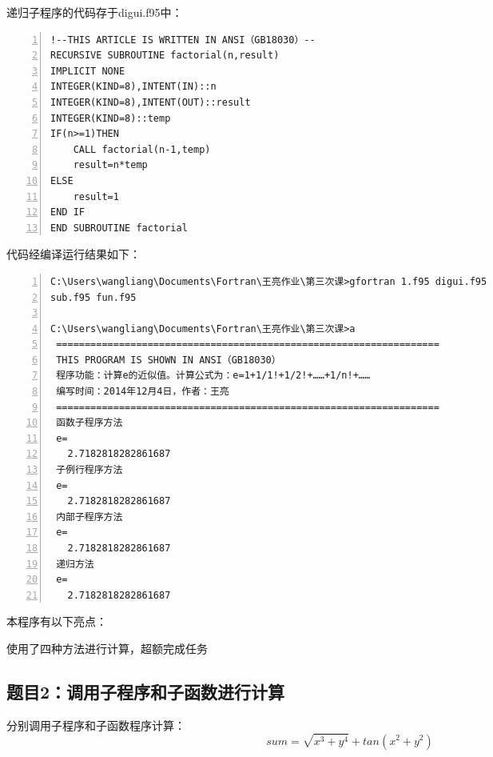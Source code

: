 \documentclass[hyperref,UTF-8]{ctexart}
\begin{document}
递归子程序的代码存于digui.f95中：

\begin{Verbatim}[numbers=left,commandchars=\\\{\},fontsize=\small]
!--THIS ARTICLE IS WRITTEN IN ANSI（GB18030）--
RECURSIVE SUBROUTINE factorial(n,result)
IMPLICIT NONE
INTEGER(KIND=8),INTENT(IN)::n
INTEGER(KIND=8),INTENT(OUT)::result
INTEGER(KIND=8)::temp
IF(n>=1)THEN
	CALL factorial(n-1,temp)
	result=n*temp
ELSE
	result=1
END IF
END SUBROUTINE factorial
\end{Verbatim}

代码经编译运行结果如下：

\begin{Verbatim}[numbers=left,fontsize=\small]
C:\Users\wangliang\Documents\Fortran\王亮作业\第三次课>gfortran 1.f95 digui.f95
sub.f95 fun.f95

C:\Users\wangliang\Documents\Fortran\王亮作业\第三次课>a
 ===================================================================
 THIS PROGRAM IS SHOWN IN ANSI（GB18030）
 程序功能：计算e的近似值。计算公式为：e=1+1/1!+1/2!+……+1/n!+……
 编写时间：2014年12月4日，作者：王亮
 ===================================================================
 函数子程序方法
 e=
   2.7182818282861687
 子例行程序方法
 e=
   2.7182818282861687
 内部子程序方法
 e=
   2.7182818282861687
 递归方法
 e=
   2.7182818282861687

\end{Verbatim}

本程序有以下亮点：
\begin{dinglist}{47}
\item 使用了四种方法进行计算，超额完成任务
\end{dinglist}
\subsection{题目2：调用子程序和子函数进行计算}
分别调用子程序和子函数程序计算：
$$sum=\sqrt{x^3+y^4} +tan(x^2+y^2)$$
\end{document}
